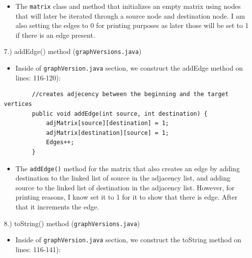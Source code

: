 \documentclass{article}
\begin{document}
\begin{itemize}

\item The \verb|matrix| class and method that initializes an empty matrix using nodes that will later be iterated through a source node and destination node. I am also setting the edges to 0 for printing purposes as later those will be set to 1 if there is an edge present. \\

\end{itemize}



\begin{large}
     7.) addEdge() method (\verb|graphVersions.java|)
\end{large}

\begin{itemize}

\item Inside of \verb|graphVersion.java| section, we construct the addEdge method on lines: 116-120):

\end{itemize}

\begin{verbatim}
        //creates adjecency between the beginning and the target vertices
        public void addEdge(int source, int destination) {
            adjMatrix[source][destination] = 1;
            adjMatrix[destination][source] = 1;
            Edges++;
        }
\end{verbatim}

\begin{itemize}

\item The \verb|addEdge()| method for the matrix that also creates an edge by adding destination to the linked list of source in the adjacency list, and adding source to the linked list of destination in the adjacency list. However, for printing reasons, I know set it to 1 for it to show that there is edge.  After that it increments the edge.\\

\end{itemize}





\begin{large}
     8.) toString() method (\verb|graphVersions.java|)
\end{large}

\begin{itemize}

\item Inside of \verb|graphVersion.java| section, we construct the toString method on lines: 116-141):

\end{itemize}
\end{document}
